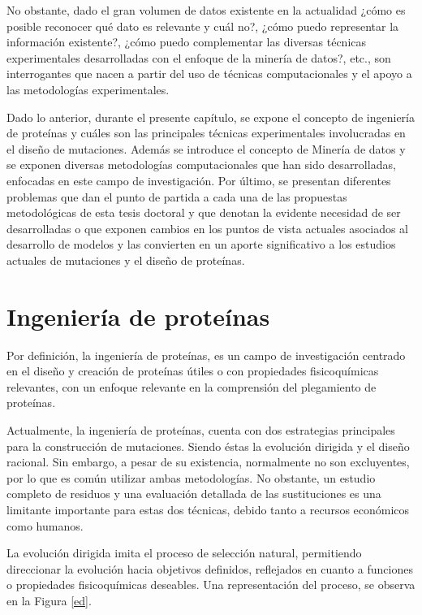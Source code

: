 No obstante, dado el gran volumen de datos existente en la actualidad ¿cómo es posible reconocer qué dato es relevante y cuál no?, ¿cómo puedo representar la información existente?, ¿cómo puedo complementar las diversas técnicas experimentales desarrolladas con el enfoque de la minería de datos?, etc., son interrogantes que nacen a partir del uso de técnicas computacionales y el apoyo a las metodologías experimentales.

Dado lo anterior, durante el presente capítulo, se expone el concepto de ingeniería de proteínas y cuáles son las principales técnicas experimentales involucradas en el diseño de mutaciones. Además se introduce el concepto de Minería de datos y se exponen diversas metodologías computacionales que han sido desarrolladas, enfocadas en este campo de investigación. Por último, se presentan diferentes problemas que dan el punto de partida a cada una de las propuestas metodológicas de esta tesis doctoral y que denotan la evidente necesidad de ser desarrolladas o que exponen cambios en los puntos de vista actuales asociados al desarrollo de modelos y las convierten en un aporte significativo a los estudios actuales de mutaciones y el diseño de proteínas. 

\section{Ingeniería de proteínas}

Por definición, la ingeniería de proteínas, es un campo de investigación centrado en el diseño y creación de proteínas útiles o con propiedades fisicoquímicas relevantes, con un enfoque relevante en la comprensión del plegamiento de proteínas.

Actualmente, la ingeniería de proteínas, cuenta con dos estrategias principales para la construcción de mutaciones. Siendo éstas la evolución dirigida y el diseño racional. Sin embargo, a pesar de su existencia, normalmente no son excluyentes, por lo que es común utilizar ambas metodologías. No obstante, un estudio completo de residuos y una evaluación detallada de las sustituciones es una limitante importante para estas dos técnicas, debido tanto a recursos económicos como humanos.

La evolución dirigida imita el proceso de selección natural, permitiendo direccionar la evolución hacia objetivos definidos, reflejados en cuanto a funciones o propiedades fisicoquímicas deseables. Una representación del proceso, se observa en la Figura \ref{ed}. 


